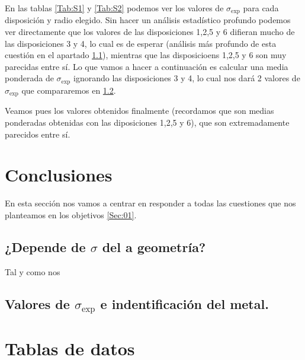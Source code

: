 \documentclass[11pt]{article}
\begin{document}



En las tablas \ref{Tab:S1} y \ref{Tab:S2} podemos ver los valores de $\sigma_{\exp}$ para cada disposición y radio elegido. Sin hacer un análisis estadístico profundo podemos ver directamente que los valores de las disposiciones 1,2,5 y 6 difieran mucho de las disposiciones 3 y 4, lo cual es de esperar (análisis más profundo de esta cuestión en el apartado \ref{Subsec:07_01}), mientras que las disposicioens 1,2,5 y 6 son muy parecidas entre sí. Lo que vamos a hacer a continuación es calcular una media ponderada \cite{Estadistica} de $\sigma_{\exp}$ ignorando las disposiciones 3 y 4, lo cual nos dará 2 valores de $\sigma_{\exp}$ que compararemos en \ref{Subsec:07_02}. 


Veamos pues los valores obtenidos finalmente (recordamos que son medias ponderadas obtenidas con las diposiciones 1,2,5 y 6), que son extremadamente parecidos entre sí. \\[1em]




\newpage

\section{Conclusiones}

En esta sección nos vamos a centrar en responder a todas las cuestiones que nos planteamos en los objetivos \ref{Sec:01}.

\subsection{¿Depende de $\sigma$ del a geometría?} \label{Subsec:07_01}

Tal y como nos

\subsection{Valores de $\sigma_{\exp}$ e indentificación del metal.} \label{Subsec:07_02}


\appendix

\section{Tablas de datos} \label{Appendix:A}










	
\printbibliography

	
\end{document}
